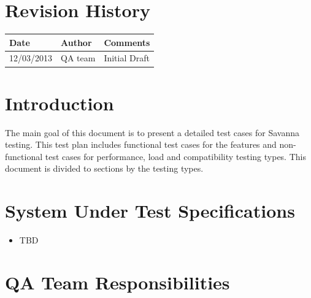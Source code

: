 \documentclass[a4paper,11pt]{article}
\begin{document}
\thispagestyle{empty}

\clearpage

\pagestyle{fancy}
\thispagestyle{fancy}

\tableofcontents

\newpage

\section{Revision History}

\begin{tabular}{|l|p{4cm}|p{10cm}|}
\hline
{\bf Date} & {\bf Author} & {\bf Comments} \\ 
\hline
12/03/2013 & QA team & Initial Draft \\ 
\hline
\end{tabular}





\section{Introduction}

The main goal of this document is to present a detailed test cases for Savanna testing. This test plan includes functional test cases for the features and non-functional test cases for performance, load and compatibility testing types. This document is divided to sections by the testing types. 





\section{System Under Test Specifications}

\begin{itemize}
\item TBD
\end{itemize}





\section{QA Team Responsibilities}
\end{document}
